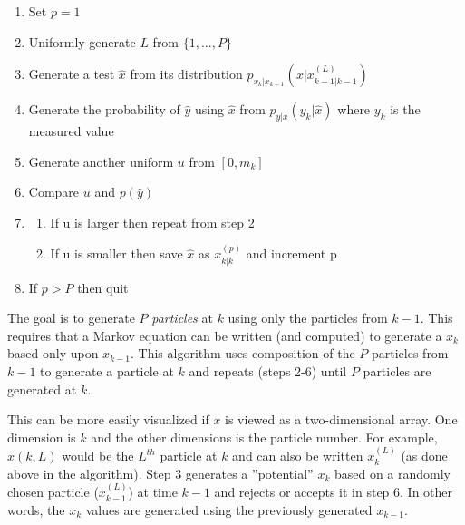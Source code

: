 \begin{enumerate}
\item Set $p = 1$
\item Uniformly generate $L$ from $\{1,..., P\}$
\item Generate a test $\hat{x}$ from its distribution
  $p_{x_k|x_{k-1}}(x|x_{k-1|k-1}^{(L)})$
\item Generate the probability of $\hat{y}$ using $\hat{x}$ from
  $p_{y|x}(y_k|\hat{x})$ where $y_k$ is the measured value
\item Generate another uniform $u$ from $[0, m_k]$
\item Compare $u$ and $p\left(\hat{y}\right)$
\item
\begin{enumerate}
\item If u is larger then repeat from step 2
\item If u is smaller then save $\hat{x}$ as $x_{k|k}^{(p)}$ and increment p
\end{enumerate}
\item If $p > P$ then quit
\end{enumerate}

The goal is to generate $P$ \emph{particles} at $k$ using only the particles from
$k-1$. This requires that a Markov equation can be written (and computed) to
generate a $x_k$ based only upon $x_{k-1}$. This algorithm uses composition of
the $P$ particles from $k-1$ to generate a particle at $k$ and repeats (steps 2-6)
until $P$ particles are generated at $k$.

This can be more easily visualized if $x$ is viewed as a two-dimensional array.
One dimension is $k$ and the other dimensions is the particle number.  For
example, $x(k,L)$ would be the $L^{th}$ particle at $k$ and can also be written
$x_k^{(L)}$ (as done above in the algorithm).  Step 3 generates a ''potential''
$x_k$ based on a randomly chosen particle ($x_{k-1}^{(L)}$) at time $k-1$ and
rejects or accepts it in step 6.  In other words, the $x_k$ values are generated
using the previously generated $x_{k-1}$.
